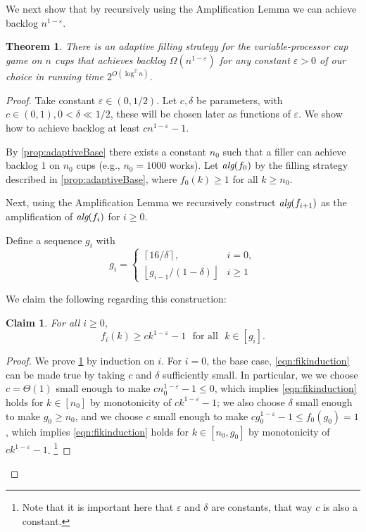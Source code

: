 \documentclass[twocolumn]{article}[10pt]
\newcommand{\alg}[1]{\textit{\text{alg}}({#1})}
\newcommand{\floor}[1]{\left\lfloor #1 \right\rfloor}
\newcommand{\ceil}[1]{\left\lceil #1 \right\rceil}
\newtheorem{clm}{Claim}
\newtheorem{theorem}{Theorem}
\begin{document}
We next show that by recursively using the Amplification Lemma we
can achieve backlog $n^{1 - \varepsilon}$.
\begin{theorem}
  \label{thm:adaptivePoly}
  There is an adaptive filling strategy for the variable-processor cup game on
  $n$ cups that achieves backlog $\Omega(n^{1-\varepsilon})$ for any constant
  $\varepsilon > 0$ of our choice in running time $2^{O(\log^2 n)}$.
\end{theorem}
\begin{proof}
  Take constant $\varepsilon \in (0,1/2)$. Let $c, \delta$ be
  parameters, with $c\in (0,1), 0 < \delta \ll 1/2$, these will
  be chosen later as functions of $\varepsilon$.
  We show how to achieve backlog at least $cn^{1-\varepsilon}-1$.

  By \cref{prop:adaptiveBase} there exists a constant
  $n_0$ such that a filler can achieve backlog $1$
  on $n_0$ cups (e.g., $n_0 = 1000$ works). Let $\alg{f_0}$ by
  the filling strategy described in \cref{prop:adaptiveBase},
  where $f_0(k)
  \ge 1$ for all $k\ge n_0$. 

  Next, using the Amplification Lemma we recursively construct
  $\alg{f_{i+1}}$ as the amplification of $\alg{f_{i}}$ for $i\ge 0$. 

  Define a sequence $g_i$ with 
  $$ g_i = \begin{cases}
    \ceil{16/\delta},  & i = 0,\\
    \floor{g_{i-1}/(1-\delta)} & i \ge 1
  \end{cases} $$

  We claim the following regarding this construction:
  \begin{clm}
    \label{clm:fikinduction}
    For all $i\ge0$,
    \begin{equation}
      f_i(k) \ge ck^{1-\varepsilon}-1\,\, \text{ for all }\,\, k\in [g_{i}].
    \label{eqn:fikinduction}
    \end{equation}
  \end{clm}
  \begin{proof}
  We prove \cref{clm:fikinduction} by induction on $i$.
  For $i=0$, the base case, \eqref{eqn:fikinduction} can
  be made true by taking $c$ and $\delta$ sufficiently small.
  In particular, we we choose $c=\Theta(1)$ small enough to make 
  $c n_0^{1-\varepsilon} -1 \le 0$, which implies
  \eqref{eqn:fikinduction} holds for $k \in [n_0]$ by
  monotonicity of $ck^{1-\varepsilon}-1$; we also choose $\delta$
  small enough to make $g_0 \ge n_0$, and we choose $c$ small
  enough to make $c g_0^{1-\varepsilon} -1 \le f_0(g_0) = 1$, which
  implies \eqref{eqn:fikinduction} holds for $k\in [n_0, g_0]$ by
  monotonicity of $ck^{1-\varepsilon}-1$. \footnote{Note
  that it is important here that $\varepsilon$ and
  $\delta$ are constants, that way $c$ is also a constant.}


\end{proof}
\end{proof}
\end{document}

